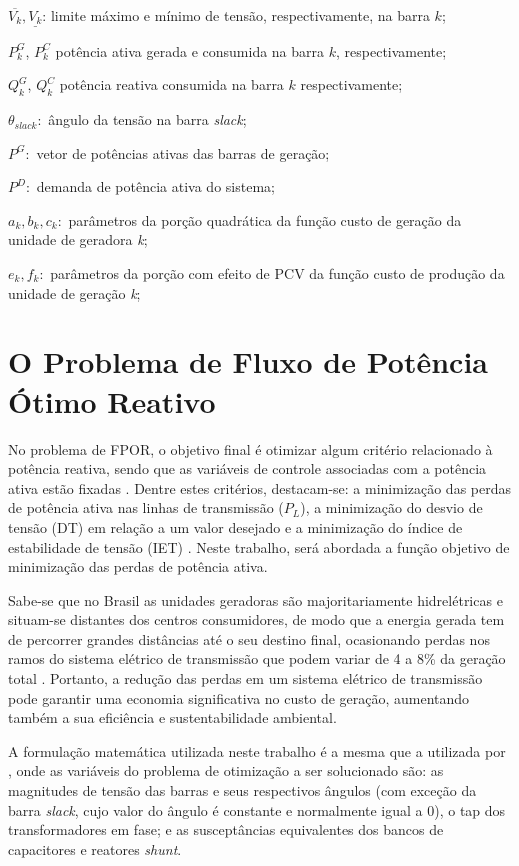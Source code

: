 \documentclass[
	12pt,				%
	openany,			%
	twoside,			%
	a4paper,			%
	chapter=TITLE,		%
	section=Title,		%
	subsection=Title,	%
	subsubsection=Title,%
	english,			%
	french,				%
	spanish,			%
	brazil			%
	]{abntex2}
\begin{document}
\begin{ERRATA}
\noindent $\overline{V_{k}}, \underline{V_{k}}$: limite máximo e mínimo de tensão, respectivamente, na barra $k$;

\noindent $P^{G}_{k}$, $P^{C}_{k}$ potência ativa gerada e consumida na barra $k$, respectivamente;

\noindent $Q^{G}_{k}$, $Q^{C}_{k}$ potência reativa consumida na barra $k$ respectivamente;

\noindent $\theta_{slack}:$ ângulo da tensão na barra \emph{slack};

\noindent $P^{G}:$ vetor de potências ativas das barras de 
geração;

\noindent $P^{D}:$ demanda de potência ativa do sistema;

\noindent $a_k, b_k, c_k:$ parâmetros da porção quadrática da função custo de geração da unidade de geradora \emph{k};

\noindent $e_k, f_k:$ parâmetros da porção com efeito de PCV da função custo de produção da unidade de geração \emph{k};


\section{O Problema de Fluxo de Potência Ótimo Reativo}

No problema de FPOR, o objetivo final é otimizar algum critério relacionado à potência reativa, sendo que as variáveis de controle associadas com a potência ativa estão fixadas \cite{teseDiegoNunesSilva}. Dentre estes critérios, destacam-se: a minimização das perdas de potência ativa nas linhas de transmissão ($P_L$), a minimização do desvio de tensão (DT) em relação a um valor desejado e a minimização do índice de estabilidade de tensão (IET) \cite{metareview}. Neste trabalho, será abordada a função objetivo de minimização das perdas de potência ativa.

Sabe-se que no Brasil as unidades geradoras são majoritariamente hidrelétricas e situam-se distantes dos centros consumidores, de modo que a energia gerada tem de percorrer grandes distâncias até o seu destino final, ocasionando perdas nos ramos do sistema elétrico de transmissão que podem variar de 4 a 8\% da geração total \cite{teseDiegoNunesSilva}. Portanto, a redução das perdas em um sistema elétrico de transmissão pode garantir uma economia significativa no custo de geração, aumentando também a sua eficiência e sustentabilidade ambiental. 

A formulação matemática utilizada neste trabalho é a mesma que a utilizada por \cite{teseDiegoNunesSilva}, onde as variáveis do problema de otimização a ser solucionado são: as magnitudes de tensão das barras e seus respectivos ângulos (com exceção da barra \emph{slack}, cujo valor do ângulo é constante e normalmente igual a 0), o tap dos transformadores em fase; e as susceptâncias equivalentes dos bancos de capacitores e reatores \emph{shunt}. 


\end{ERRATA}
\end{document}
